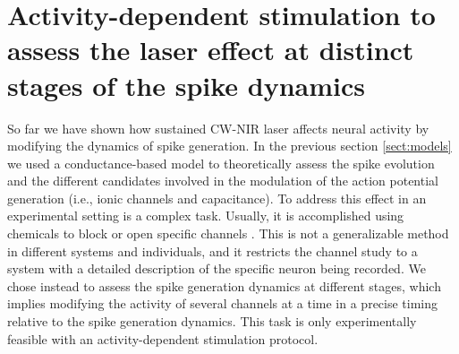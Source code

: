 \section{Activity-dependent stimulation to assess the laser effect at distinct stages of the spike dynamics} 
\label{sec:activity dependent}
So far we have shown how sustained CW-NIR laser affects neural activity by modifying the dynamics of spike generation. In the previous section \ref{sect:models} we used a conductance-based model to theoretically assess the spike evolution and the different candidates involved in the modulation of the action potential generation (i.e., ionic channels and capacitance). To address this effect in an experimental setting is a complex task. Usually, it is accomplished using chemicals to block or open specific channels \parencite{liang_temperature-dependent_2009}. This is not a generalizable method in different systems and individuals, and it restricts the channel study to a system with a detailed description of the specific neuron being recorded. We chose instead to assess the spike generation dynamics at different stages, which implies modifying the activity of several channels at a time in a precise timing relative to the spike generation dynamics. This task is only experimentally feasible with an activity-dependent stimulation protocol.

